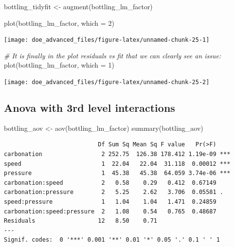 \documentclass[
]{book}
\newenvironment{Shaded}{\begin{snugshade}}{\end{snugshade}}
\newcommand{\AttributeTok}[1]{\textcolor[rgb]{0.77,0.63,0.00}{#1}}
\newcommand{\CommentTok}[1]{\textcolor[rgb]{0.56,0.35,0.01}{\textit{#1}}}
\newcommand{\DecValTok}[1]{\textcolor[rgb]{0.00,0.00,0.81}{#1}}
\newcommand{\FunctionTok}[1]{\textcolor[rgb]{0.00,0.00,0.00}{#1}}
\newcommand{\NormalTok}[1]{#1}
\newcommand{\OtherTok}[1]{\textcolor[rgb]{0.56,0.35,0.01}{#1}}
\begin{document}
\begin{Shaded}
\begin{Highlighting}[]
\NormalTok{bottling\_tidyfit }\OtherTok{\textless{}{-}} \FunctionTok{augment}\NormalTok{(bottling\_lm\_factor)}
\end{Highlighting}
\end{Shaded}

\begin{Shaded}
\begin{Highlighting}[]
\FunctionTok{plot}\NormalTok{(bottling\_lm\_factor, }\AttributeTok{which =} \DecValTok{2}\NormalTok{)}
\end{Highlighting}
\end{Shaded}

\texttt{[image: doe\_advanced\_files/figure-latex/unnamed-chunk-25-1]}

\begin{Shaded}
\begin{Highlighting}[]
\CommentTok{\# It is finally in the plot residuals vs fit that we can clearly see an issue:}
\FunctionTok{plot}\NormalTok{(bottling\_lm\_factor, }\AttributeTok{which =} \DecValTok{1}\NormalTok{)}
\end{Highlighting}
\end{Shaded}

\texttt{[image: doe\_advanced\_files/figure-latex/unnamed-chunk-25-2]}

\hypertarget{anova-with-3rd-level-interactions}{%
\subsection{Anova with 3rd level interactions}\label{anova-with-3rd-level-interactions}}

\begin{Shaded}
\begin{Highlighting}[]
\NormalTok{bottling\_aov }\OtherTok{\textless{}{-}} \FunctionTok{aov}\NormalTok{(bottling\_lm\_factor)}
\FunctionTok{summary}\NormalTok{(bottling\_aov)}
\end{Highlighting}
\end{Shaded}

\begin{verbatim}
                           Df Sum Sq Mean Sq F value   Pr(>F)    
carbonation                 2 252.75  126.38 178.412 1.19e-09 ***
speed                       1  22.04   22.04  31.118  0.00012 ***
pressure                    1  45.38   45.38  64.059 3.74e-06 ***
carbonation:speed           2   0.58    0.29   0.412  0.67149    
carbonation:pressure        2   5.25    2.62   3.706  0.05581 .  
speed:pressure              1   1.04    1.04   1.471  0.24859    
carbonation:speed:pressure  2   1.08    0.54   0.765  0.48687    
Residuals                  12   8.50    0.71                     
---
Signif. codes:  0 '***' 0.001 '**' 0.01 '*' 0.05 '.' 0.1 ' ' 1
\end{verbatim}
\end{document}
